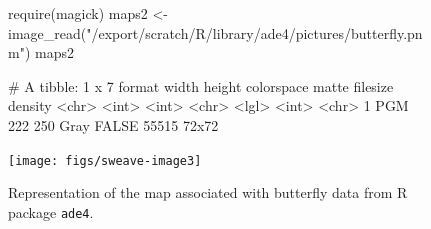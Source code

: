 \documentclass[a4paper,10pt]{article}
\begin{document}
\begin{figure}[H]
\begin{center}
\begin{Schunk}
\begin{Sinput}
  require(magick)
  maps2 <-  image_read("/export/scratch/R/library/ade4/pictures/butterfly.pnm") 
  maps2
\end{Sinput}
\begin{Soutput}
# A tibble: 1 x 7
  format width height colorspace matte filesize density
  <chr>  <int>  <int> <chr>      <lgl>    <int> <chr>  
1 PGM      222    250 Gray       FALSE    55515 72x72  
\end{Soutput}
\end{Schunk}
\texttt{[image: figs/sweave-image3]}
\caption{Representation of the map associated with butterfly data from R package \texttt{ade4}.}
\label{fig:image3}
\end{center}
\end{figure}
\end{document}
